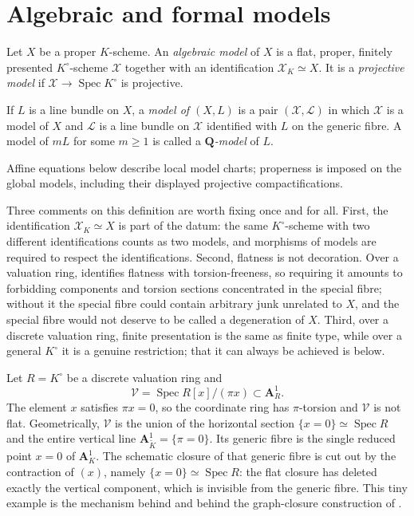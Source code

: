 \section{Algebraic and formal models}

\begin{definition}\label{def:algebraic-projective-model}
Let $X$ be a proper $K$-scheme. An \emph{algebraic model} of $X$ is a flat,
proper, finitely presented $K^\circ$-scheme $\mathcal X$ together with an
identification $\mathcal X_K\simeq X$. It is a \emph{projective model} if
$\mathcal X\to\operatorname{Spec}K^\circ$ is projective.

If $L$ is a line bundle on $X$, a \emph{model of $(X,L)$} is a pair
$(\mathcal X,\mathcal L)$ in which $\mathcal X$ is a model of $X$ and
$\mathcal L$ is a line bundle on $\mathcal X$ identified with $L$ on the
generic fibre. A model of $mL$ for some $m\geq1$ is called a
\emph{$\mathbf Q$-model} of $L$.
\end{definition}

Affine equations below describe local model charts; properness is imposed
on the global models, including their displayed projective compactifications.

Three comments on this definition are worth fixing once and for all.  First,
the identification $\mathcal X_K\simeq X$ is part of the datum: the same
$K^\circ$-scheme with two different identifications counts as two models,
and morphisms of models are required to respect the identifications.
Second, flatness is not decoration.  Over a valuation ring,
 identifies flatness with
torsion-freeness, so requiring it amounts to forbidding components and
torsion sections concentrated in the special fibre; without it the special
fibre could contain arbitrary junk unrelated to $X$, and the special fibre
would not deserve to be called a degeneration of $X$.  Third, over a
discrete valuation ring, finite presentation is the same as finite type,
while over a general $K^\circ$ it is a genuine restriction; that it can
always be achieved is  below.

\begin{example}
\label{ex:flat-closure-toy}
Let $R=K^\circ$ be a discrete valuation ring and
\[
                 \mathcal V=\operatorname{Spec}R[x]/(\pi x)
                 \subset\mathbf A^1_R.
\]
The element $x$ satisfies $\pi x=0$, so the coordinate ring has
$\pi$-torsion and $\mathcal V$ is not flat.  Geometrically, $\mathcal V$ is
the union of the horizontal section $\{x=0\}\simeq\operatorname{Spec}R$ and
the entire vertical line $\mathbf A^1_{\widetilde K}=\{\pi=0\}$.  Its
generic fibre is the single reduced point $x=0$ of $\mathbf A^1_K$.  The
schematic closure of that generic fibre is cut out by the contraction of
$(x)$, namely $\{x=0\}\simeq\operatorname{Spec}R$: the flat closure has
deleted exactly the vertical component, which is invisible from the generic
fibre.  This tiny example is the mechanism behind
 and behind the graph-closure
construction of .
\end{example}

